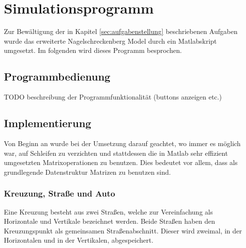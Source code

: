 \chapter{Simulationsprogramm}
Zur Bewältigung der in Kapitel \ref{sec:aufgabenstellung} beschriebenen
Aufgaben wurde das erweiterte Nagelschreckenberg Model 
durch ein Matlabskript umgesetzt. Im folgenden wird dieses
Programm besprochen.

\section{Programmbedienung}
TODO beschreibung der Programmfunktionalität (buttons anzeigen etc.)

\section{Implementierung}
Von Beginn an wurde bei der Umsetzung darauf geachtet, wo immer es möglich 
war, auf Schleifen zu verzichten und stattdessen die in Matlab sehr effizient 
umgesetzten Matrixoperationen zu benutzen. Dies bedeutet vor allem, dass als 
grundlegende Datenstruktur Matrizen zu benutzen sind. 

\subsection{Kreuzung, Straße und Auto}
Eine Kreuzung besteht aus zwei Straßen, welche zur Vereinfachung als Horizontale und Vertikale
bezeichnet werden. Beide Straßen haben den Kreuzungspunkt als gemeinsamen Straßenabschnitt. Dieser
wird zweimal, in der Horizontalen und in der Vertikalen, abgespeichert. 

